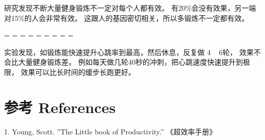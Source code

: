 研究发现不断大量健身锻炼不一定对每个人都有效。
有20\%会没有效果，另一端对15\%的人会非常有效。
这跟人的基因密切相关，所以多锻炼不一定都有效。

\begin{description}
\tightlist
\item[]
= = = = = = = = =
\end{description}

实验发现，如锻炼能快速提升心跳率到最高，然后休息，反复做 4 ~ 6轮，
效果不会比大量健身锻炼差。
例如每天做几轮40秒的冲刺，把心跳速度快速提升到极限，
效果可以比长时间的缓步长跑更好。


\hypertarget{ux53c2ux8003-references}{%
\section{参考 References}\label{ux53c2ux8003-references}}

1.  Young, Scott. ''The Little book of Productivity.''  《超效率手册》\\


